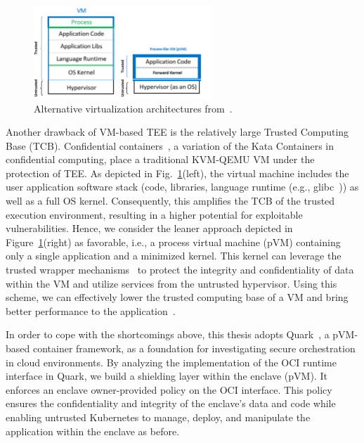  
\begin{figure}[!htb]
  \centering
  \includegraphics[width=0.6\textwidth]{images/VM_vs_PVM.png}
  \caption[Alternative virtualization architectures.]{Alternative virtualization architectures from~\cite*{10.1145/3436512}.}
  \label{fig:VM_vs_PVM}
\end{figure}
 
Another drawback of VM-based TEE is the relatively large Trusted Computing Base (TCB). Confidential containers~\cite*{confidential_kata}, a variation of the Kata Containers in confidential computing, place a traditional KVM-QEMU VM under the protection of TEE. As depicted in Fig.~\ref{fig:VM_vs_PVM}(left), the virtual machine includes the 
user application software stack (code, libraries, language runtime (e.g., glibc~\cite*{glibc})) as well as a full OS kernel. Consequently, this amplifies the TCB of the trusted execution environment, resulting in a higher potential for exploitable vulnerabilities. Hence, we consider 
the leaner approach depicted in Figure~\ref{fig:VM_vs_PVM}(right) as favorable, i.e., a process virtual machine (pVM) containing only a single application and a minimized kernel. This kernel can leverage the trusted wrapper mechanisms~\cite*{Hoekstra2013UsingII} to protect the integrity and confidentiality of data within the VM and utilize services 
from the untrusted hypervisor. Using this scheme, we can effectively lower the trusted computing base of a VM and bring better performance to the application~\cite*{quark_performance_report}.
 

In order to cope with the shortcomings above, this thesis adopts Quark~\cite*{quark}, a pVM-based container framework, as a foundation for investigating secure orchestration in cloud environments. By analyzing the implementation of the OCI runtime interface in Quark, we build a shielding layer within the 
enclave (pVM). It enforces an enclave owner-provided policy on the OCI interface. This policy ensures the confidentiality and integrity of the enclave's data and code while enabling untrusted Kubernetes to manage, deploy, and manipulate the application within the enclave as before.
 
